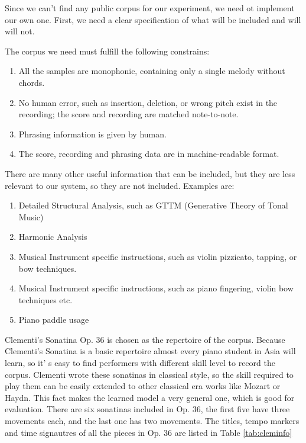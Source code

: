 Since we can't find any public corpus for our experiment, we need ot implement our own one. First, we need a clear specification of what will be included and will will not.

The corpus we need must fulfill the following constrains:
\begin{enumerate}
   \item All the samples are monophonic, containing only a single melody without chords.
   \item No human error, such as insertion, deletion, or wrong pitch exist in the recording; the score and recording are matched note-to-note.
   \item Phrasing information is given by human. 
   \item The score, recording and phrasing data are in machine-readable format.

\end{enumerate}

There are many other useful information that can be included, but they are less relevant to our system, so they are not included. Examples are:

\begin{enumerate}
   \item Detailed Structural Analysis, such as GTTM (Generative Theory of Tonal Music)\cite{GTTM}
   \item Harmonic Analysis
   \item Musical Instrument specific instructions, such as violin pizzicato, tapping, or bow techniques.
   \item Musical Instrument specific instructions, such as piano fingering, violin bow techniques etc.
   \item Piano paddle usage
\end{enumerate}

Clementi's Sonatina Op. 36 is chosen as the repertoire of the corpus.  Because  Clementi's Sonatina is a basic repertoire almost every piano student in Asia will learn, so it' s easy to find performers with different skill level to record the corpus. Clementi wrote these sonatinas in classical style, so the skill required to play them can be easily extended to other classical era works like Mozart or Haydn. This fact makes the learned model a very general one, which is good for evaluation. There are six sonatinas included in Op. 36, the first five have three movements each, and the last one has two movements. The titles, tempo markers and time signautres of all the pieces in Op. 36 are listed in Table \ref{tab:cleminfo}

